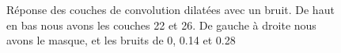 \documentclass[12pt]{article}
\begin{document}
\begin{figure}[htb]
  \hfill
  \hfill
  \hfill
  \caption{Réponse des couches de convolution dilatées avec un bruit. De haut en bas nous avons les couches 22 et 26. De gauche à droite nous avons le masque, et les bruits de 0, 0.14 et 0.28}\label{fig:occlus_dynamic}
\end{figure}
\end{document}
